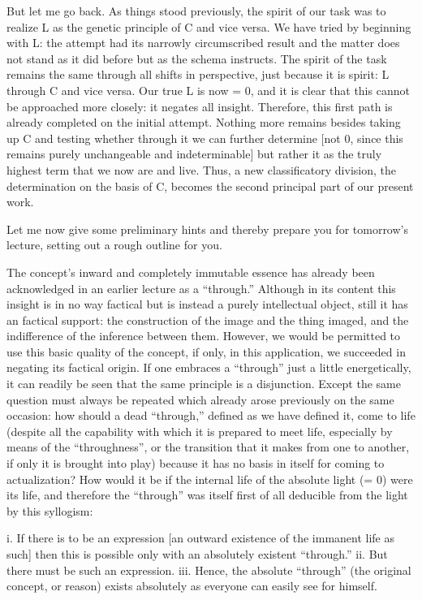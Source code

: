 But let me go back.
As things stood previously,
the spirit of our task was to realize
L as the genetic principle of C and vice versa.
We have tried by beginning with L:
the attempt had its narrowly circumscribed result
and the matter does not stand as it did before
but as the schema instructs.
The spirit of the task remains the same
through all shifts in perspective,
just because it is spirit:
L through C and vice versa.
Our true L is now = 0,
and it is clear that
this cannot be approached more closely:
it negates all insight.
Therefore, this first path is
already completed on the initial attempt.
Nothing more remains besides
taking up C and testing whether
through it we can further determine
[not 0, since this remains purely
unchangeable and indeterminable]
but rather it as the truly highest term
that we now are and live.
Thus, a new classificatory division,
the determination on the basis of C,
becomes the second principal part
of our present work.

Let me now give some preliminary hints
and thereby prepare you for tomorrow’s lecture,
setting out a rough outline for you.

The concept’s inward and completely immutable essence has
already been acknowledged in an earlier lecture as a “through.”
Although in its content this insight is in no way factical
but is instead a purely intellectual object,
still it has an factical support:
the construction of the image and the thing imaged,
and the indifference of the inference between them.
However, we would be permitted to use this basic quality of the concept,
if only, in this application, we succeeded in negating its factical origin.
If one embraces a “through” just a little energetically,
it can readily be seen that the same principle is a disjunction.
Except the same question must always be repeated which
already arose previously on the same occasion:
how should a dead “through,” defined as we have defined it,
come to life
(despite all the capability with
which it is prepared to meet life,
especially by means of the “throughness”,
or the transition that it makes from one to another,
if only it is brought into play)
because it has no basis in itself
for coming to actualization?
How would it be if the internal life
of the absolute light (= 0) were its life,
and therefore the “through” was itself
first of all deducible from the light by this syllogism:

i. If there is to be an expression
[an outward existence of the immanent life as such]
then this is possible only with an absolutely existent “through.”
ii. But there must be such an expression.
iii. Hence, the absolute “through” (the original concept, or reason)
exists absolutely as everyone can easily see for himself.

